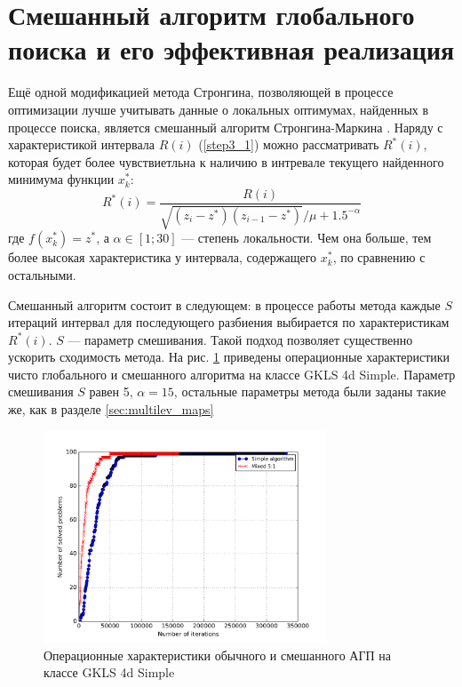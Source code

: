 \section{Смешанный алгоритм глобального поиска и его эффективная реализация}
Ещё одной модификацией метода Стронгина, позволяющей в процессе оптимизации лучше учитывать данные о локальных оптимумах, найденных в процессе поиска, является смешанный алгоритм Стронгина-Маркина \cite{mixedAlg}.
Наряду с характеристикой интервала \(R(i)\) (\ref{step3_1}) можно рассматривать \(R^*(i)\), которая будет более чувствиетльна к наличию в интревале текущего найденного минимума функции \(x_k^*\):
\begin{displaymath}
R^*(i)=\frac{R(i)}{\sqrt{(z_i-z^*)(z_{i-1}-z^*)}/\mu + 1.5^{-\alpha}}
\end{displaymath}
где \(f(x_k^*)=z^*\), а \(\alpha \in [1;30]\) --- степень локальности. Чем она больше, тем более высокая характеристика у интервала, содержащего \(x_k^*\), по сравнению с остальными.
\par
Смешанный алгоритм состоит в следующем: в процессе работы метода каждые \(S\) итераций интервал для последующего разбиения выбирается по характеристикам \(R^*(i)\). \(S\) --- параметр смешивания.
Такой подход позволяет существенно ускорить сходимость метода. На рис. \ref{fig:localMixOP4d} приведены операционные характеристики чисто глобального и смешанного алгоритма на классе GKLS 4d Simple.
Параметр смешивания \(S\) равен 5, \(\alpha=15\), остальные параметры метода были заданы такие же, как в разделе \ref{sec:multilev_maps}
\begin{figure}[ht]
  \center
  \includegraphics[width=0.75\textwidth]{images/mixed_op4d.png}
  \caption{Операционные характеристики обычного и смешанного АГП на классе GKLS 4d Simple}
  \label{fig:localMixOP4d}
\end{figure}
